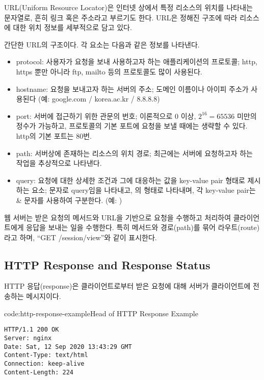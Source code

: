 URL(Uniform Resource Locator)은 인터넷 상에서 특정 리소스의 위치를 나타내는 문자열로, 흔히 링크 혹은 주소라고 부르기도 한다. URL은 정해진 구조에 따라 리소스에 대한 위치 정보를 세부적으로 담고 있다.

    {}

\는 간단한 URL의 구조이다. 각 요소는 다음과 같은 정보를 나타낸다.

\begin{itemize}
    \item protocol: 사용자가 요청을 보내 사용하고자 하는 애플리케이션의 프로토콜; http, https 뿐만 아니라 ftp, mailto 등의 프로토콜도 많이 사용된다.
    \item hostname: 요청을 보내고자 하는 서버의 주소; 도메인 이름이나 아이피 주소가 사용된다 (예: google.com / korea.ac.kr / 8.8.8.8)
    \item port: 서버에 접근하기 위한 관문의 번호; 이론적으로 0 이상, $2^{16}=65536$ 미만의 정수가 가능하고, 프로토콜의 기본 포트에 요청을 보낼 때에는 생략할 수 있다. http의 기본 포트는 80번.
    \item path: 서버상에 존재하는 리소스의 위치 경로; 최근에는 서버에 요청하고자 하는 작업을 추상적으로 나타낸다.
    \item query: 요청에 대한 상세한 조건과 그에 대응하는 값을 key-value pair 형태로 제시하는 요소;  문자로 query임을 나타내고, 의 형태로 나타내며, 각 key-value pair는 \cd\& 문자를 사용하여 구분한다. (예: )
\end{itemize}

웹 서버는 받은 요청의 메서드와 URL을 기반으로 요청을 수행하고 처리하여 클라이언트에게 응답을 보내는 일을 수행한다. 특히 메서드와 경로(path)를 묶어 라우트(route)라고 하며, ``GET /session/view''와 같이 표시한다.

\subsection*{HTTP Response and Response Status}
HTTP 응답(response)은 클라이언트로부터 받은 요청에 대해 서버가 클라이언트에 전송하는 메시지이다.

\begin{codeenv}{code:http-response-example}{Head of HTTP Response Example}\begin{verbatim}
HTTP/1.1 200 OK
Server: nginx
Date: Sat, 12 Sep 2020 13:43:29 GMT
Content-Type: text/html
Connection: keep-alive
Content-Length: 224
\end{verbatim}
\end{codeenv}

